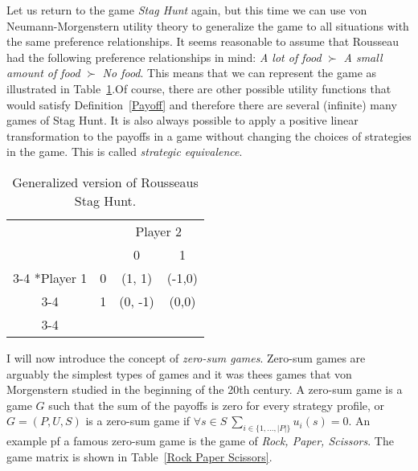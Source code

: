 \documentclass{article}
\theoremstyle{definition}
\theoremstyle{remark}
\begin{document}
Let us return to the game \emph{Stag Hunt} again, but this time we can
use von Neumann-Morgenstern utility theory to generalize the game to
all situations with the same preference relationships. It seems
reasonable to assume that Rousseau had the following preference
relationships in mind: \emph{A lot of food} $\succ$ \emph{A small
  amount of food} $\succ$ \emph{No food}. This means that we can
represent the game as illustrated in Table~\ref{Stag Hunt 2}.Of course, there are other possible utility functions that would
satisfy Definition~\ref{Payoff} and therefore there are several
(infinite) many games of Stag Hunt. It is also always possible to
apply a positive linear transformation to the payoffs in a game
without changing the choices of strategies in the game. This is called
\emph{strategic equivalence}. \\

\begin{table}[h!]
  \centering
  \setlength{\extrarowheight}{2pt}
  \begin{tabular}{cc|c|c|}
    & \multicolumn{1}{c}{} & \multicolumn{2}{c}{Player 2}\\
    & \multicolumn{1}{c}{} & \multicolumn{1}{c}{0}  &
                                                              \multicolumn{1}{c}{1}
    \\\cline{3-4}
\multirow{2}*{Player 1}  & 0 & (1, 1) &
                                                                   (-1,0) \\\cline{3-4}
    & 1 & (0, -1) & (0,0) \\\cline{3-4}
  \end{tabular}
  \caption{Generalized version of Rousseaus Stag Hunt.}
  \label{Stag Hunt 2}
\end{table}

I will now introduce the concept of \emph{zero-sum games}. Zero-sum
games are arguably the simplest types of games and it was thees games
that von Morgenstern studied in the beginning of the 20th century. A
zero-sum game is a game $G$ such that the sum of the payoffs is zero
for every strategy profile, or $G = (P,U,S)$ is a zero-sum game if $\forall s
\in S~\sum_{i \in \{1,...,|P|\}} u_i(s) = 0$. An example pf a famous
zero-sum game is the game of \emph{Rock, Paper, Scissors}. The game
matrix is shown in Table~\ref{Rock Paper Scissors}.\\
\end{document}
